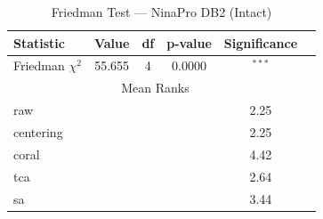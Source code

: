 \begin{table}[htbp]
\centering
\caption{Friedman Test — NinaPro DB2 (Intact)}
\label{tab:friedman_db2}
\begin{tabular}{lccccc}
\toprule
Statistic & Value & df & p-value & Significance \\
\midrule
Friedman $\chi^2$ & 55.655 & 4 & 0.0000 & $^{***}$ \\
\midrule
\multicolumn{5}{c}{Mean Ranks} \\
\midrule
raw & & & & 2.25 \\
centering & & & & 2.25 \\
coral & & & & 4.42 \\
tca & & & & 2.64 \\
sa & & & & 3.44 \\
\bottomrule
\end{tabular}
\end{table}